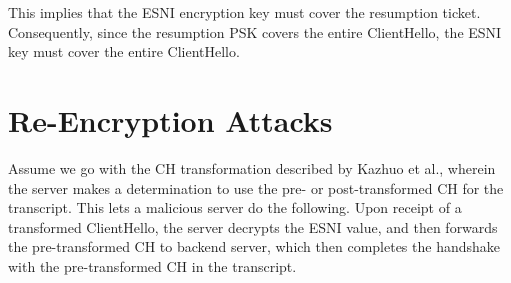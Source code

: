 \documentclass{article}
\begin{document}
This implies that the ESNI encryption key must cover the resumption ticket. Consequently, 
since the resumption PSK covers the entire ClientHello, the ESNI key must cover the entire
ClientHello.


\section{Re-Encryption Attacks}

Assume we go with the CH transformation described by Kazhuo et al., wherein the server makes a determination
to use the pre- or post-transformed CH for the transcript. This lets a malicious server do the following. 
Upon receipt of a transformed ClientHello, the server decrypts the ESNI value, and then forwards the pre-transformed
CH to backend server, which then completes the handshake with the pre-transformed CH in the transcript.





\end{document}
